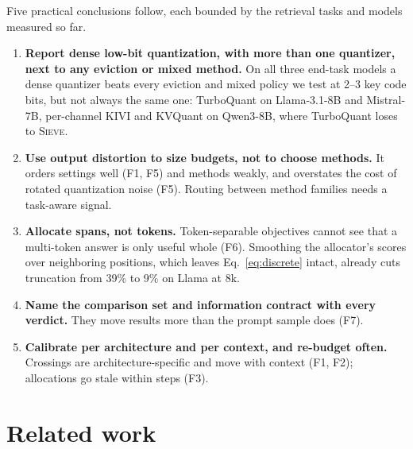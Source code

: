 \documentclass{article}
\newcommand{\sieve}{\textsc{Sieve}}
\theoremstyle{definition}
\begin{document}
Five practical conclusions follow, each bounded by the retrieval tasks and models measured so far.
\begin{enumerate}[leftmargin=*,itemsep=1pt,topsep=2pt]
  \item \textbf{Report dense low-bit quantization, with more than one quantizer, next to any eviction or mixed method.}  On all three end-task models a dense quantizer beats every eviction and mixed policy we test at 2--3 key code bits, but not always the same one: TurboQuant on Llama-3.1-8B and Mistral-7B, per-channel KIVI and KVQuant on Qwen3-8B, where TurboQuant loses to \sieve{}.
  \item \textbf{Use output distortion to size budgets, not to choose methods.}  It orders settings well (F1, F5) and methods weakly, and overstates the cost of rotated quantization noise (F5).  Routing between method families needs a task-aware signal.
  \item \textbf{Allocate spans, not tokens.}  Token-separable objectives cannot see that a multi-token answer is only useful whole (F6).  Smoothing the allocator's scores over neighboring positions, which leaves Eq.~\ref{eq:discrete} intact, already cuts truncation from 39\% to 9\% on Llama at 8k.
  \item \textbf{Name the comparison set and information contract with every verdict.}  They move results more than the prompt sample does (F7).
  \item \textbf{Calibrate per architecture and per context, and re-budget often.}  Crossings are architecture-specific and move with context (F1, F2); allocations go stale within steps (F3).
\end{enumerate}


\section{Related work}
\label{sec:related}
\end{document}
